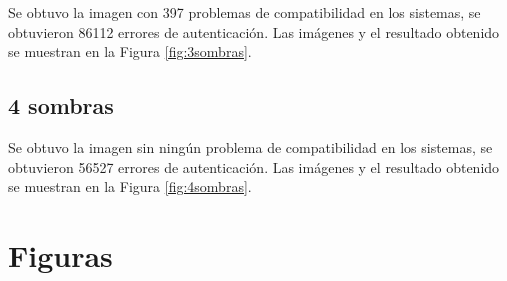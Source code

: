 \documentclass{article}
\begin{document}
Se obtuvo la imagen con 397 problemas de compatibilidad en los sistemas, se obtuvieron 86112 errores de autenticación.
Las imágenes y el resultado obtenido se muestran en la Figura \ref{fig:3sombras}.

\subsection{4 sombras}
Se obtuvo la imagen sin ningún problema de compatibilidad en los sistemas, se obtuvieron 56527 errores de autenticación.
Las imágenes y el resultado obtenido se muestran en la Figura \ref{fig:4sombras}.

\clearpage
\appendix
\section{Figuras}
\end{document}
